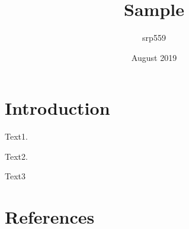 \documentclass{article}
\title{Sample}
\author{srp559}
\date{August 2019}
\begin{document}
\maketitle

\section{Introduction}

Text1\citep{worldbankSocialDevelopmentLocal2014}.

Text2\cite{joshiInstitutionalOpportunitiesConstraints2000}.


Text3

\section{References}
% 

\end{document}
